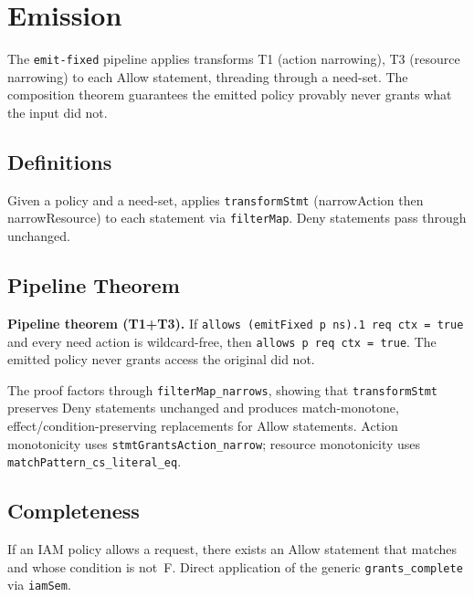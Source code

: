 \chapter{Emission}\label{chap:emission}

The \texttt{emit-fixed} pipeline applies transforms T1 (action narrowing),
T3 (resource narrowing) to each Allow statement, threading through a
need-set.  The composition theorem guarantees the emitted policy
provably never grants what the input did not.

\section{Definitions}

\begin{definition}[emitFixed]\label{def:emitFixed}
\leanok
Given a policy and a need-set, applies \texttt{transformStmt}
(narrowAction then narrowResource) to each statement via
\texttt{filterMap}.  Deny statements pass through unchanged.
\end{definition}

\section{Pipeline Theorem}

\begin{theorem}\label{thm:emitFixed_narrows}
\leanok
\textbf{Pipeline theorem (T1+T3).}
If \texttt{allows (emitFixed p ns).1 req ctx = true} and every need
action is wildcard-free, then \texttt{allows p req ctx = true}.
The emitted policy never grants access the original did not.

The proof factors through \texttt{filterMap\_narrows}, showing that
\texttt{transformStmt} preserves Deny statements unchanged and
produces match-monotone, effect/condition-preserving replacements for
Allow statements.  Action monotonicity uses
\texttt{stmtGrantsAction\_narrow}; resource monotonicity uses
\texttt{matchPattern\_cs\_literal\_eq}.
\end{theorem}

\section{Completeness}

\begin{corollary}\label{cor:grants_complete}
\leanok
If an IAM policy allows a request, there exists an Allow statement
that matches and whose condition is not~F.  Direct application of
the generic \texttt{grants\_complete} via \texttt{iamSem}.
\end{corollary}
